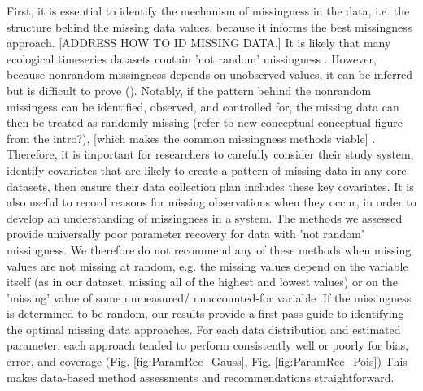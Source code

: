 \documentclass{article}
\begin{document}
\begin{linenumbers}
First, it is essential to identify the mechanism of missingness in the data, i.e. the structure behind the missing data values, because it informs the best missingness approach.  [ADDRESS HOW TO ID MISSING DATA.] It is likely that many ecological timeseries datasets contain 'not random' missingness \citep{bowler2025treating}. However,  because nonrandom missingness depends on unobserved values, it can be inferred but is difficult to prove (\citep{nakagawa_missing_2015}). Notably, if the pattern behind the nonrandom missingess can be identified, observed, and controlled for, the missing data can then be treated as randomly missing (refer to new conceptual conceptual figure from the intro?), [which makes the common missingness methods viable]  \citep{newman_missing_2014, nakagawa_missing_2015}.   Therefore, it is important for researchers to carefully consider their study system, identify covariates that are likely to create a pattern of missing data in any core datasets, then ensure their data collection plan includes these key covariates. It is also useful to  record reasons for missing observations when they occur, in order to develop an understanding of missingness in a system.  The methods we assessed provide universally poor parameter recovery for data with 'not random' missingness. We therefore do not recommend any of these methods when missing values are not missing at random, e.g. the missing values depend on the variable itself (as in our dataset, missing all of the highest and lowest values) or on the 'missing' value of some unmeasured/ unaccounted-for variable .If the missingness is determined to be random, our results provide a first-pass guide to identifying the optimal missing data approaches.  For each data distribution and estimated parameter, each approach tended to perform consistently well or poorly for bias, error, and coverage (Fig. \ref{fig:ParamRec_Gauss},  Fig. \ref{fig:ParamRec_Pois})  This makes data-based method assessments and recommendations straightforward. 


\end{linenumbers}
\end{document}
